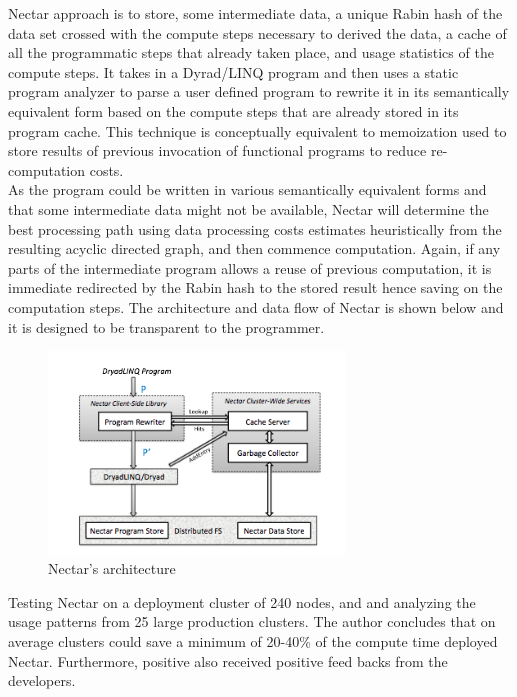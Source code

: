 \documentclass[]{article}
\begin{document}
Nectar approach is to store, some intermediate data, a unique Rabin hash of the data set crossed with the compute steps necessary to derived the data, a cache of all the programmatic steps that already taken place, and usage statistics of the compute steps. It takes in a Dyrad/LINQ program and then uses a static program analyzer to parse a user defined program to rewrite it in its semantically equivalent form based on the compute steps that are already stored in its program cache. This technique is conceptually equivalent to memoization used to store results of previous invocation of functional programs to reduce re-computation costs.\\

As the program could be written in various semantically equivalent forms and that some intermediate data might not be available, Nectar will determine the best processing path using data processing costs estimates heuristically from the resulting acyclic directed graph, and then commence computation. Again, if any parts of the intermediate program allows a reuse of previous computation, it is immediate redirected by the Rabin hash to the stored result hence saving on the computation steps. The architecture and data flow of Nectar is shown below and it is designed to be transparent to the programmer. \\

\begin{figure}[here]
	\begin{center}
		\includegraphics[width=0.7\textwidth]{nectar11.png}
		\caption{Nectar’s architecture}
		\label{fig:nectar11}
	\end{center}
\end{figure}

Testing Nectar on a deployment cluster of 240 nodes, and and analyzing the usage patterns from 25 large production clusters. The author concludes that on average clusters could save a minimum of 20-40\% of the compute time deployed Nectar. Furthermore, positive also received positive feed backs from the developers.\\
\end{document}
